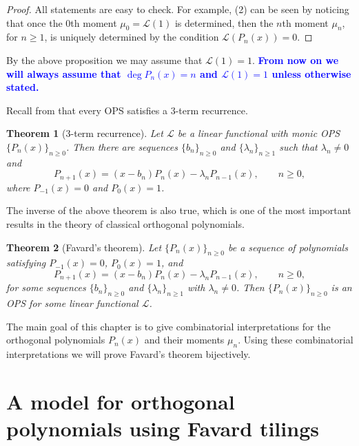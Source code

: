 \documentclass[oneside]{book}
\numberwithin{equation}{section}
\newtheorem{thm}{Theorem}[section]
\theoremstyle{definition}
\newcommand\LL{\mathcal{L}}
\renewcommand\emph[1]{\textcolor{blue}{\bf #1}}
\begin{document}
\begin{proof}
  All statements are easy to check. For example, (2) can be seen by
  noticing that once the \( 0 \)th moment \( \mu_0=\LL(1) \) is
  determined, then the \( n \)th moment \( \mu_n \), for \( n\ge1 \),
  is uniquely determined by the condition \( \LL(P_n(x)) = 0 \).
\end{proof}

By the above proposition we may assume that \( \LL(1) = 1 \).
\emph{From now on we will always assume that \( \deg P_n(x) = n \) and
  \( \LL(1) = 1 \) unless otherwise stated.}

Recall from  that every OPS satisfies a 3-term
recurrence.

\begin{thm}[3-term recurrence]
  Let \( \LL \) be a linear functional with monic OPS
  \( \{ P_n(x) \}_{n\ge 0} \). Then there are sequences
  \( \{ b_n\}_{n\ge 0} \) and \( \{ \lambda_n\}_{n\ge 1} \) such that
  \( \lambda_n\ne 0 \) and
  \[
    P_{n+1}(x) = (x-b_n) P_n(x) - \lambda_n P_{n-1}(x), \qquad n\ge0,
  \]
  where \( P_{-1}(x) = 0 \) and \( P_0(x) = 1 \).
\end{thm}

The inverse of the above theorem is also true, which is one of the
most important results in the theory of classical orthogonal
polynomials.

\begin{thm}[Favard's theorem]
  Let \( \{ P_n(x) \}_{n\ge 0} \) be a sequence of polynomials
  satisfying \( P_{-1}(x) = 0 \), \( P_0(x) = 1 \), and
  \begin{equation}\label{eq:3-RR}
    P_{n+1}(x) = (x-b_n) P_n(x) - \lambda_n P_{n-1}(x), \qquad n\ge0,
  \end{equation}
  for some sequences \( \{ b_n\}_{n\ge 0} \) and
  \( \{ \lambda_n\}_{n\ge 1} \) with \( \lambda_n\ne 0 \). 
 Then
  \( \{ P_n(x) \}_{n\ge 0} \) is an OPS for some linear functional
  \( \LL \).
\end{thm}

The main goal of this chapter is to give combinatorial interpretations
for the orthogonal polynomials \( P_n(x) \) and their moments
\( \mu_n \). Using these combinatorial interpretations we will prove
Favard's theorem bijectively.

\section{A model for orthogonal polynomials using Favard tilings}
\end{document}

